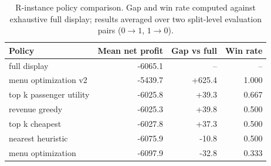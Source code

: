 \begin{table}[t]
\centering
\caption{R-instance policy comparison. Gap and win rate computed against exhaustive full display; results averaged over two split-level evaluation pairs ($0{\to}1$, $1{\to}0$).}
\label{tab:r_main}
\begin{tabular}{lrrr}
\hline
Policy & Mean net profit & Gap vs full & Win rate \\
\hline
full display & -6065.1 & -- & -- \\
menu optimization v2 & -5439.7 & +625.4 & 1.000 \\
top k passenger utility & -6025.8 & +39.3 & 0.667 \\
revenue greedy & -6025.3 & +39.8 & 0.500 \\
top k cheapest & -6027.8 & +37.3 & 0.500 \\
nearest heuristic & -6075.9 & -10.8 & 0.500 \\
menu optimization & -6097.9 & -32.8 & 0.333 \\
\hline
\end{tabular}
\end{table}
